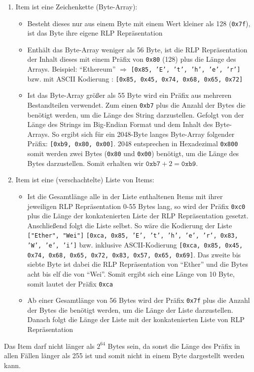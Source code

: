 \documentclass[runningheads]{llncs}
\begin{document}
\begin{enumerate}
  \item Item ist eine Zeichenkette (Byte-Array):
  \begin{itemize}
    \item Besteht dieses nur aus einem Byte mit einem Wert kleiner als 128 (\texttt{0x7f}), ist das Byte ihre eigene RLP Repräsentation
    \item Enthält das Byte-Array weniger als 56 Byte, ist die RLP Repräsentation der Inhalt dieses mit einem Präfix von \texttt{0x80} (128) plus die Länge des Arrays. Beispiel: "`Ethereum"' $\Rightarrow$ \texttt{[0x85, 'E', 't', 'h', 'e', 'r']} bzw. mit ASCII Kodierung : \texttt{[0x85, 0x45, 0x74, 0x68, 0x65, 0x72]}
    \item Ist das Byte-Array größer als 55 Byte wird ein Präfix aus mehreren Bestandteilen verwendet. Zum einen \texttt{0xb7} plus die Anzahl der Bytes die benötigt werden, um die Länge des String darzustellen. Gefolgt von der Länge des Strings im Big-Endian Format und dem Inhalt des Byte-Arrays. So ergibt sich für ein 2048-Byte langes Byte-Array folgender Präfix: \texttt{[0xb9, 0x80, 0x00]}.
    2048 entsprechen in Hexadezimal \texttt{0x800} somit werden zwei Bytes (\texttt{0x80} und \texttt{0x00}) benötigt, um die Länge des Bytes darzustellen. Somit erhalten wir $\texttt{0xb7} + 2 = \texttt{0xb9}$.
  \end{itemize} 
  \item Item ist eine (verschachtelte) Liste von Items:
  \begin{itemize}
    \item Ist die Gesamtlänge alle in der Liste enthaltenen Items mit ihrer jeweiligen RLP Repräsentation 0-55 Bytes lang, so wird der Präfix \texttt{0xc0} plus die Länge der konkatenierten Liste der RLP Repräsentation gesetzt. Anschließend folgt die Liste selbst. So wäre die Kodierung der Liste \texttt{["Ether", "Wei"]} \texttt{[0xca, 0x85, 'E', 't', 'h', 'e', 'r', 0x83, 'W', 'e', 'i']} bzw. inklusive ASCII-Kodierung \texttt{[0xca, 0x85, 0x45, 0x74, 0x68, 0x65, 0x72, 0x83, 0x57, 0x65, 0x69]}. Das zweite bis siebte Byte ist dabei die RLP Repräsentation von "`Ether"' und die Bytes acht bis elf die von "`Wei"'. Somit ergibt sich eine Länge von 10 Byte, somit lautet der Präfix \texttt{0xca}
    \item Ab einer Gesamtlänge von 56 Bytes wird der Präfix \texttt{0x7f} plus die Anzahl der Bytes die benötigt werden, um die Länge der Liste darzustellen. Danach folgt die Länge der Liste mit der konkatenierten Liste von RLP Repräsentation
  \end{itemize}
\end{enumerate}
Das Item darf nicht länger als $2^{64}$ Bytes sein, da sonst die Länge des Präfix in allen Fällen länger als 255 ist und somit nicht in einem Byte dargestellt werden kann.
\end{document}
